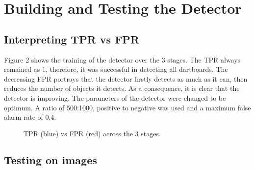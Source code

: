 \documentclass[a4paper]{article}
\begin{document}
\section*{Building and Testing the Detector}
\subsection*{Interpreting TPR vs FPR}
\vspace{-0.7em}

Figure 2 shows the training of the detector over the 3 stages. The TPR always
remained as 1, therefore, it was successful in detecting all dartboards. The
decreasing FPR portrays that the detector firstly detects as much as it can,
then reduces the number of objects it detects. As a consequence, it is clear
that the detector is improving. The parameters of the detector were changed to
be optimum. A ratio of 500:1000, positive to negative was used and a maximum
false alarm rate of 0.4.

\begin{figure}[H]
  \centering
  \caption{TPR (blue) vs FPR (red) across the 3 stages.}
\end{figure}

\subsection*{Testing on images}
\vspace{-0.7em}
\end{document}
